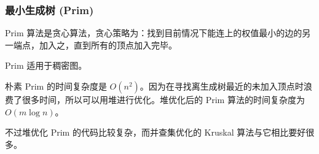 \subsubsection{最小生成树 (Prim)}
	Prim 算法是贪心算法，贪心策略为：找到目前情况下能连上的权值最小的边的另一端点，加入之，直到所有的顶点加入完毕。
	
	Prim 适用于稠密图。
	
	朴素 Prim 的时间复杂度是 $O(n^{2})$。因为在寻找离生成树最近的未加入顶点时浪费了很多时间，所以可以用堆进行优化。堆优化后的 Prim 算法的时间复杂度为 $O(m\log n)$。
	
	不过堆优化 Prim 的代码比较复杂，而并查集优化的 Kruskal 算法与它相比要好很多。
	
	